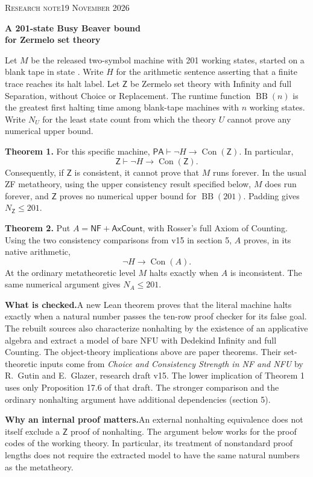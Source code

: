 \documentclass[10pt,a4paper]{article}
\newcommand{\Con}{\operatorname{Con}}\newcommand{\PA}{\mathsf{PA}}\newcommand{\PRA}{\mathsf{PRA}}\newcommand{\Z}{\mathsf{Z}}\newcommand{\NF}{\mathsf{NF}}\newcommand{\Ax}{\mathsf{AxCount}}\newcommand{\BB}{\operatorname{BB}}\newcommand{\ACA}{\mathsf{ACA}_0}
\newcommand{\id}[1]{\texttt{\small\detokenize{#1}}}
\newcommand{\hd}[1]{\par\vspace{3pt}{\large\bfseries\color{ink}#1}\par}
\newcommand{\shd}[1]{\par\textbf{#1}\enspace}
\begin{document}
\thispagestyle{empty}
{\small\scshape\color{link} Research note\hfill 19 November 2026}\par\vspace{4mm}
{\LARGE\bfseries\color{ink} A 201-state Busy Beaver bound\\[2pt] for Zermelo set theory}\par\vspace{2mm}
Let $M$ be the released two-symbol machine with 201 working states, started on a blank tape in state \id{k:64}. Write $H$ for the arithmetic sentence asserting that a finite trace reaches its halt label. Let $\Z$ be Zermelo set theory with Infinity and full Separation, without Choice or Replacement. The runtime function $\BB(n)$ is the greatest first halting time among blank-tape machines with $n$ working states. Write $N_U$ for the least state count from which the theory $U$ cannot prove any numerical upper bound.
\hd{The result}
\textbf{Theorem 1.} For this specific machine, $\PA\vdash\neg H\to\Con(\Z)$. In particular,
\[
                   \Z\vdash\neg H\longrightarrow\Con(\Z).
\]
Consequently, if $\Z$ is consistent, it cannot prove that $M$ runs forever. In the usual ZF metatheory, using the upper consistency result specified below, $M$ does run forever, and $\Z$ proves no numerical upper bound for $\BB(201)$. Padding gives $N_{\Z}\le201$.

\textbf{Theorem 2.} Put $A=\NF+\Ax$, with Rosser's full Axiom of Counting. Using the two consistency comparisons from v15 in section 5, $A$ proves, in its native arithmetic,
\[
                     \neg H\longrightarrow\Con(A).
\]
At the ordinary metatheoretic level $M$ halts exactly when $A$ is inconsistent. The same numerical argument gives $N_A\le201$.

\shd{What is checked.}A new Lean theorem proves that the literal machine halts exactly when a natural number passes the ten-row proof checker for its false goal. The rebuilt sources also characterize nonhalting by the existence of an applicative algebra and extract a model of bare NFU with Dedekind Infinity and full Counting. The object-theory implications above are paper theorems. Their set-theoretic inputs come from \emph{Choice and Consistency Strength in NF and NFU} by R.~Gutin and E.~Glazer, research draft v15. The lower implication of Theorem 1 uses only Proposition 17.6 of that draft. The stronger comparison and the ordinary nonhalting argument have additional dependencies (section 5).

\shd{Why an internal proof matters.}An external nonhalting equivalence does not itself exclude a $\Z$ proof of nonhalting. The argument below works for the proof codes of the working theory. In particular, its treatment of nonstandard proof lengths does not require the extracted model to have the same natural numbers as the metatheory.
\end{document}

